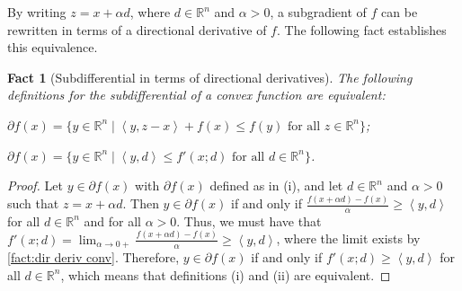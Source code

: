 \documentclass[smallextended,numbook,nospthms]{svjour3}
\theoremstyle{plain}
\newtheorem{fact}[theorem]{Fact}
\theoremstyle{definition}
\def\RR{\mathds R}
\newcommand{\scal}[2]{\left\langle{#1},{#2}  \right\rangle}
\begin{document}
By writing $z = x + \alpha d$, where $d \in \RR^n$ and $\alpha>0$, a subgradient of $f$ can be rewritten in terms of a directional derivative of $f$. The following fact establishes this equivalence.
\begin{fact}[Subdifferential in terms of directional derivatives]\label{fact:subdif dir deriv}
	The following definitions for the subdifferential of a convex function are equivalent:
	\begin{listi}
		\item $\partial f(x) = \{y \in \RR^n \mid \scal{y}{z-x} + f(x) \leq f(y) \text{ for all } z \in \RR^n \}$;
		\item $\partial f(x) = \{y \in \RR^n \mid \scal{y}{d} \leq f'(x;d) \text{ for all } d \in \RR^n \}$.
	\end{listi}
\end{fact}
\begin{proof}
	Let $y \in \partial f(x)$ with $\partial f(x)$ defined as in (i), and let $d \in \RR^n$ and $\alpha>0$ such that $z = x + \alpha d$. Then $y \in \partial f(x)$ if and only if $\frac{f(x+\alpha d)-f(x)}{\alpha} \geq \scal{y}{d}$ for all $d \in \RR^n$ and for all $\alpha > 0$. Thus, we must have that $f'(x;d)=\lim _{\alpha \rightarrow 0+} \frac{f(x+\alpha d)-f(x)}{\alpha} \geq \scal{y}{d}$, where the limit exists by \cref{fact:dir deriv conv}. Therefore, $y \in \partial f(x)$ if and only if $f'(x;d) \geq \scal{y}{d}$ for all $d \in \RR^n$, which means that definitions (i) and (ii) are equivalent.
\end{proof}
\end{document}

